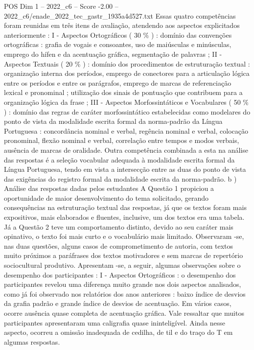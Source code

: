 \begin{textsample}{POS Dim 1 – 2022\_c6 – Score -2.00 – 2022\_c6/enade\_2022\_tec\_gastr\_1935a4d527.txt}
Essas quatro competências foram reunidas em três itens de avaliação, atendendo aos aspectos explicitados anteriormente : I - Aspectos Ortográficos ( 30 \% ) : domínio das convenções ortográficas : grafia de vogais e consoantes, uso de maiúsculas e minúsculas, emprego do hífen e da acentuação gráfica, segmentação de palavras ; II - Aspectos Textuais ( 20 \% ) : domínio dos procedimentos de estruturação textual : organização interna dos períodos, emprego de conectores para a articulação lógica entre os períodos e entre os parágrafos, emprego de marcas de referenciação lexical e pronominal ; utilização dos sinais de pontuação que contribuem para a organização lógica da frase ; III - Aspectos Morfossintáticos e Vocabulares ( 50 \% ) : domínio das regras de caráter morfossintático estabelecidas como modelares do ponto de vista da modalidade escrita formal da norma-padrão da Língua Portuguesa : concordância nominal e verbal, regência nominal e verbal, colocação pronominal, flexão nominal e verbal, correlação entre tempos e modos verbais, ausência de marcas de oralidade.
Outra competência combinada a esta na análise das respostas é a seleção vocabular adequada à modalidade escrita formal da Língua Portuguesa, tendo em vista a intersecção entre as duas do ponto de vista das exigências do registro formal da modalidade escrita da norma-padrão. b ) Análise das respostas dadas pelos estudantes A Questão 1 propiciou a oportunidade de maior desenvolvimento do tema solicitado, gerando consequências na estruturação textual das respostas, já que os textos foram mais expositivos, mais elaborados e fluentes, inclusive, um dos textos era uma tabela.
Já a Questão 2 teve um comportamento distinto, devido ao seu caráter mais opinativo, o texto foi mais curto e o vocabulário mais limitado.
Observaram -se, nas duas questões, alguns casos de comprometimento de autoria, com textos muito próximos a paráfrases dos textos motivadores e sem marcas de repertório sociocultural produtivo.
Apresentam -se, a seguir, algumas observações sobre o desempenho dos participantes : I - Aspectos Ortográficos : o desempenho dos participantes revelou uma diferença muito grande nos dois aspectos analisados, como já foi observado nos relatórios dos anos anteriores : baixo índice de desvios da grafia padrão e grande índice de desvios de acentuação.
Em vários casos, ocorre ausência quase completa de acentuação gráfica.
Vale ressaltar que muitos participantes apresentaram uma caligrafia quase ininteligível.
Ainda nesse aspecto, ocorreu a omissão inadequada de cedilha, de til e do traço do T em algumas respostas.

\end{textsample}
